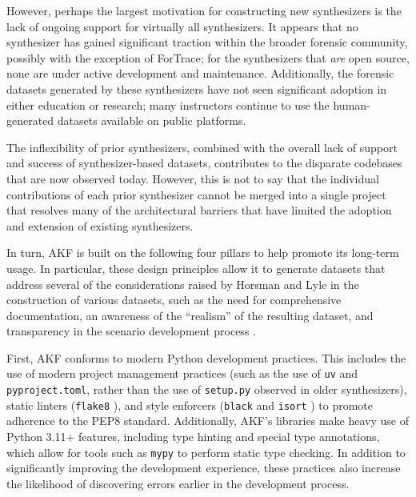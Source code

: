 \documentclass[letterpaper,12pt]{report}
\newcommand{\passthrough}[1]{#1}
\begin{document}
However, perhaps the largest motivation for constructing new
synthesizers is the lack of ongoing support for virtually all
synthesizers. It appears that no synthesizer has gained significant
traction within the broader forensic community, possibly with the
exception of ForTrace; for the synthesizers that \emph{are} open source,
none are under active development and maintenance. Additionally, the
forensic datasets generated by these synthesizers have not seen
significant adoption in either education or research; many instructors
continue to use the human-generated datasets available on public
platforms.

The inflexibility of prior synthesizers, combined with the overall lack
of support and success of synthesizer-based datasets, contributes to the
disparate codebases that are now observed today. However, this is not to
say that the individual contributions of each prior synthesizer cannot
be merged into a single project that resolves many of the architectural
barriers that have limited the adoption and extension of existing
synthesizers.

In turn, AKF is built on the following four pillars to help promote its
long-term usage. In particular, these design principles allow it to
generate datasets that address several of the considerations raised by
Horsman and Lyle in the construction of various datasets, such as the
need for comprehensive documentation, an awareness of the ``realism'' of
the resulting dataset, and transparency in the scenario development
process \cite{horsmanDatasetConstructionChallenges2021}.

First, AKF conforms to modern Python development practices. This
includes the use of modern project management practices (such as the use
of \passthrough{\lstinline!uv!} \cite{AstralshUv2025} and
\passthrough{\lstinline!pyproject.toml!}, rather than the use of
\passthrough{\lstinline!setup.py!} observed in older synthesizers),
static linters (\passthrough{\lstinline!flake8!}
\cite{PyCQAFlake82025}), and style enforcers
(\passthrough{\lstinline!black!}
\cite{langaBlackUncompromisingPython2025} and
\passthrough{\lstinline!isort!} \cite{PyCQAIsort2025}) to promote
adherence to the PEP8 standard. Additionally, AKF's libraries make heavy
use of Python 3.11+ features, including type hinting and special type
annotations, which allow for tools such as
\passthrough{\lstinline!mypy!} \cite{PythonMypy2025} to perform
static type checking. In addition to significantly improving the
development experience, these practices also increase the likelihood of
discovering errors earlier in the development process.
\end{document}
